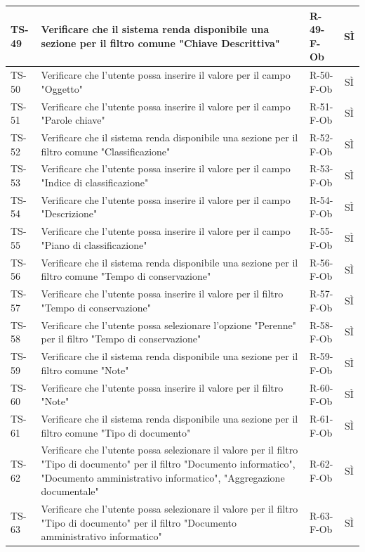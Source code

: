 \documentclass[a4paper,12pt]{article}
\begin{document}
\begin{longtable}{|p{1.5cm}|p{8.3cm}|p{2.4cm}|c|}
\hline
TS-49 & Verificare che il sistema renda disponibile una sezione per il filtro comune "Chiave Descrittiva" & R-49-F-Ob & SÌ \\
\hline
TS-50 & Verificare che l'utente possa inserire il valore per il campo "Oggetto" & R-50-F-Ob & SÌ \\
\hline
TS-51 & Verificare che l'utente possa inserire il valore per il campo "Parole chiave" & R-51-F-Ob & SÌ \\
\hline
TS-52 & Verificare che il sistema renda disponibile una sezione per il filtro comune "Classificazione" & R-52-F-Ob & SÌ \\
\hline
TS-53 & Verificare che l'utente possa inserire il valore per il campo "Indice di classificazione" & R-53-F-Ob & SÌ \\
\hline
TS-54 & Verificare che l'utente possa inserire il valore per il campo "Descrizione" & R-54-F-Ob & SÌ \\
\hline
TS-55 & Verificare che l'utente possa inserire il valore per il campo "Piano di classificazione" & R-55-F-Ob & SÌ \\
\hline
TS-56 & Verificare che il sistema renda disponibile una sezione per il filtro comune "Tempo di conservazione" & R-56-F-Ob & SÌ \\
\hline
TS-57 & Verificare che l'utente possa inserire il valore per il filtro "Tempo di conservazione" & R-57-F-Ob & SÌ \\
\hline
TS-58 & Verificare che l'utente possa selezionare l'opzione "Perenne" per il filtro "Tempo di conservazione" & R-58-F-Ob & SÌ \\
\hline
TS-59 & Verificare che il sistema renda disponibile una sezione per il filtro comune "Note" & R-59-F-Ob & SÌ \\
\hline
TS-60 & Verificare che l'utente possa inserire il valore per il filtro "Note" & R-60-F-Ob & SÌ \\
\hline
TS-61 & Verificare che il sistema renda disponibile una sezione per il filtro comune "Tipo di documento" & R-61-F-Ob & SÌ \\
\hline
TS-62 & Verificare che l'utente possa selezionare il valore per il filtro "Tipo di documento" per il filtro "Documento informatico", "Documento amministrativo informatico", "Aggregazione documentale" & R-62-F-Ob & SÌ \\
\hline
TS-63 & Verificare che l'utente possa selezionare il valore per il filtro "Tipo di documento" per il filtro "Documento amministrativo informatico" & R-63-F-Ob & SÌ \\
\hline

\end{longtable}
\end{document}

